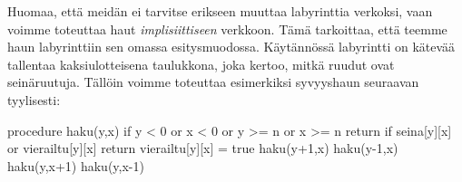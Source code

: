 Huomaa, että meidän ei tarvitse erikseen muuttaa labyrinttia
verkoksi, vaan voimme toteuttaa haut \emph{implisiittiseen} verkkoon.
Tämä tarkoittaa, että teemme haun labyrinttiin sen omassa
esitysmuodossa. Käytännössä labyrintti on kätevää tallentaa kaksiulotteisena
taulukkona, joka kertoo, mitkä ruudut ovat seinäruutuja.
Tällöin voimme toteuttaa esimerkiksi syvyyshaun seuraavan tyylisesti:

\begin{code}
procedure haku(y,x)
    if y < 0 or x < 0 or y >= n or x >= n
        return
    if seina[y][x] or vierailtu[y][x]
        return
    vierailtu[y][x] = true
    haku(y+1,x)
    haku(y-1,x)
    haku(y,x+1)
    haku(y,x-1)
\end{code}
